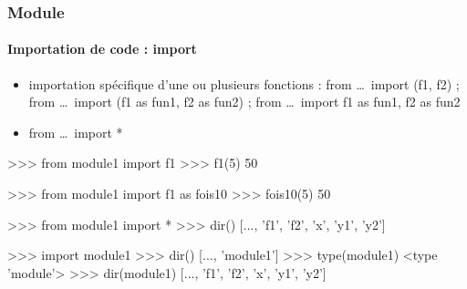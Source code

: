 \begin{frame}[fragile]
\frametitle{Module}
\framesubtitle{Importation de code : import}
\begin{itemize}
\item importation spécifique d'une ou plusieurs fonctions : from \dots\ import (f1, f2) ; from \dots\ import (f1 as fun1, f2 as fun2) ; from \dots\ import f1 as fun1, f2 as fun2
\item from \dots\ import *
\end{itemize}
\begin{pythonConsole}
>>> from module1 import f1 
>>> f1(5)
50
\end{pythonConsole}
\begin{pythonConsole}
>>> from module1 import f1 as fois10 
>>> fois10(5)
50
\end{pythonConsole}
\begin{pythonConsole}
>>> from module1 import *
>>> dir()
[..., 'f1', 'f2', 'x', 'y1', 'y2']
\end{pythonConsole}
\begin{pythonConsole}
>>> import module1
>>> dir()
[..., 'module1']
>>> type(module1)
<type 'module'>
>>> dir(module1)
[..., 'f1', 'f2', 'x', 'y1', 'y2']
\end{pythonConsole}
\end{frame}

